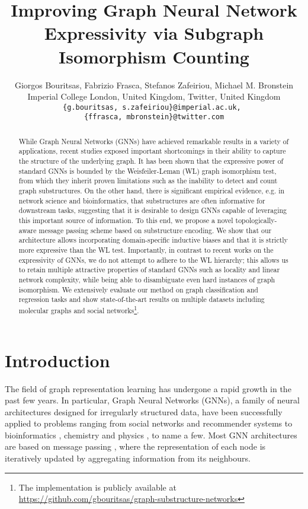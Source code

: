 \documentclass{article} \usepackage{iclr2021_conference,times}
\title{Improving Graph Neural Network Expressivity via Subgraph Isomorphism Counting}
\author{Giorgos Bouritsas, Fabrizio Frasca, Stefanos Zafeiriou, Michael M. Bronstein
  \\
  Imperial College London, United Kingdom, Twitter, United Kingdom\\
 \texttt{\{g.bouritsas, s.zafeiriou\}@imperial.ac.uk, } \\
 \texttt{\{ffrasca, mbronstein\}@twitter.com} \\
}
\begin{document}
\maketitle

\begin{abstract}
While Graph Neural Networks (GNNs) have achieved remarkable results in a variety of applications, recent studies exposed important shortcomings in their ability to capture the structure of the underlying graph. It has been shown that the expressive power of standard GNNs is bounded by the Weisfeiler-Leman (WL) graph isomorphism test, from which they inherit proven limitations such as the inability to detect and count graph substructures. On the other hand, there is significant empirical evidence, e.g. in network science and bioinformatics, that substructures are often informative for downstream tasks, suggesting that it is desirable to design GNNs capable of leveraging this important source of information. To this end, we propose a novel topologically-aware message passing scheme based on substructure encoding. We show that our architecture allows incorporating domain-specific inductive biases and that it is strictly more expressive than the WL test. Importantly, in contrast to recent works on the expressivity of GNNs, we do not attempt to adhere to the WL hierarchy; this allows us to retain multiple attractive properties of standard GNNs such as locality and linear network complexity, while being able to disambiguate even hard instances of graph isomorphism. We extensively evaluate our method on graph classification and regression tasks and show state-of-the-art results on multiple datasets including molecular graphs and social networks\footnote{The implementation is publicly available at \url{https://github.com/gbouritsas/graph-substructure-networks}}.  

\end{abstract}

\section{Introduction}

The field of graph representation learning has undergone a rapid growth in the past few years. 
In particular, Graph Neural Networks (GNNs), a family of neural architectures designed for irregularly structured data, have been successfully applied to problems 
ranging from social networks and recommender systems \citep{ying2018graph} to bioinformatics \citep{fout2017protein, gainza2020deciphering}, chemistry \citep{duvenaud2015convolutional, gilmer2017neural, sanchez2019machine} and physics \citep{DBLP:conf/icml/KipfFWWZ18, battaglia2016interaction}, to name a few. 
Most GNN architectures are based on message passing \citep{gilmer2017neural}, where the representation of each node is iteratively updated by aggregating information from its neighbours. 
\end{document}
